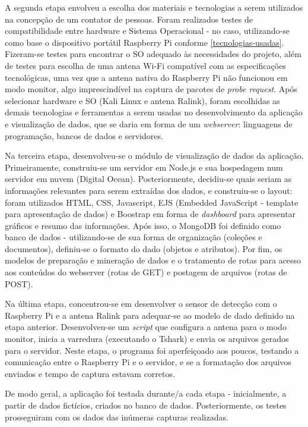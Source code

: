A segunda etapa envolveu a escolha dos materiais e tecnologias a serem
utilizados na concepção de um contator de pessoas. Foram realizados testes de
compatibilidade entre hardware e Sistema Operacional - no caso, utilizando-se
como base o dispositivo portátil Raspberry Pi conforme
\autoref{tecnologias-usadas}. Fizeram-se testes para encontrar o SO adequado às
necessidades do projeto, além de testes para escolha de uma antena Wi-Fi
compatível com as especificações tecnológicas, uma vez que a antena nativa do
Raspberry Pi não funcionou em modo monitor, algo imprescindível na captura de
pacotes de \emph{probe request}. Após selecionar hardware e SO (Kali Linux e antena Ralink), foram escolhidas as demais
tecnologias e ferramentas a serem usadas no desenvolvimento da aplicação e
visualização de dados, que se daria em forma de um \emph{webserver}: linguagens
de programação, bancos de dados e servidores.

Na terceira etapa, desenvolveu-se o módulo de visualização de dados da aplicação.
Primeiramente, construiu-se um servidor em Node.js e sua hospedagem num servidor em nuvem (Digital Ocean). Posteriormente, decidiu-se quais seriam as informações relevantes para serem extraídas dos dados, e construiu-se o layout: foram utilizados HTML, CSS, Javascript, EJS (Embedded
JavaScript - template para apresentação de dados) e Boostrap em forma de
\emph{dashboard} para apresentar gráficos e resumo das informações. Após isso, o
MongoDB foi definido como banco de dados - utilizando-se de sua forma de
organização (coleções e documentos), definiu-se o formato do dado (objetos e
atributos). Por fim, os modelos de preparação e mineração  de dados e o
tratamento de rotas para acesso aos conteúdos do webserver (rotas de GET) e
postagem de arquivos (rotas de POST).

Na última etapa, concentrou-se em desenvolver o sensor de detecção com o
Raspberry Pi e a antena Ralink para adequar-se ao modelo de dado definido na
etapa anterior. Desenvolveu-se um \emph{script} que configura a antena para o
modo monitor, inicia a varredura (executando o Tshark) e envia os arquivos
gerados para o servidor. Neste etapa, o programa foi aperfeiçoado aos poucos,
testando a comunicação entre o Raspberry Pi e o servidor, e se a formatação dos
arquivos enviados e tempo de captura estavam corretos.

De modo geral, a aplicação foi testada durante/a cada etapa - inicialmente,
a partir de dados fictícios, criados no banco de dados. Posteriormente, os testes
prosseguiram com os dados das inúmeras capturas realizadas.

